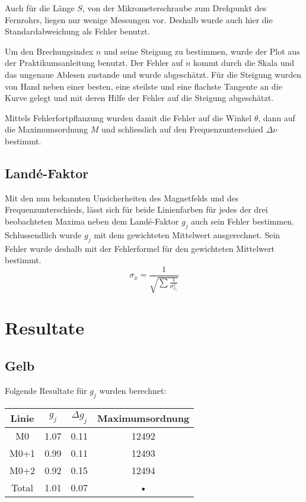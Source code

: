 \documentclass[a4paper,parskip,11pt, DIV12]{scrreprt}
\begin{document}
	Auch für die Länge $S$, von der Mikrometerschraube zum Drehpunkt des Fernrohrs, liegen nur wenige Messungen vor. Deshalb wurde auch hier die Standardabweichung als Fehler benutzt.
	
	Um den Brechungsindex $n$ und seine Steigung zu bestimmen, wurde der Plot aus der Praktikumsanleitung benutzt. Der Fehler auf $n$ kommt durch die Skala und das ungenaue Ablesen zustande und wurde abgeschätzt.
Für die Steigung wurden von Hand neben einer besten, eine steilste und eine flachste Tangente an die Kurve gelegt und mit deren Hilfe der Fehler auf die Steigung abgeschätzt.

	Mittels Fehlerfortpflanzung wurden damit die Fehler auf die Winkel $\theta$, dann auf die Maximumsordnung $M$ und schliesslich auf den Frequenzunterschied $\Delta \nu$ bestimmt.
	
	\section{Landé-Faktor}
	
	Mit den nun bekannten Unsicherheiten des Magnetfelds und des Frequenzunterschieds, lässt sich für beide Linienfarben für jedes der drei beobachteten Maxima neben dem Landé-Faktor $g_j$ auch sein Fehler bestimmen. Schlussendlich wurde $g_j$ mit dem gewichteten Mittelwert ausgerechnet. Sein Fehler wurde deshalb mit der Fehlerformel für den gewichteten Mittelwert bestimmt. 
	\begin{equation}
	\label{Fehler gewichteter Mittelwert}
	\sigma_{\bar{x}} = \frac{1}{\sqrt{\sum \frac{1}{\sigma_{x_i}^2}}}
	\end{equation}
	
	\chapter{Resultate}
	
	\section{Gelb}
	Folgende Resultate für $g_j$ wurden berechnet:
	
\begin{tabular}{|c|c|c|c|}
\hline 
Linie  & $g_j$ & $\Delta g_j$ & Maximumsordnung \\ 
\hline 
M0 & 1.07 & 0.11 & 12492 \\ 
\hline 
M0+1 & 0.99 & 0.11 & 12493 \\ 
\hline 
M0+2 & 0.92 & 0.15 & 12494 \\ 
\hline 
Total & 1.01 & 0.07 & • \\ 
\hline 
\end{tabular} 
\end{document}

